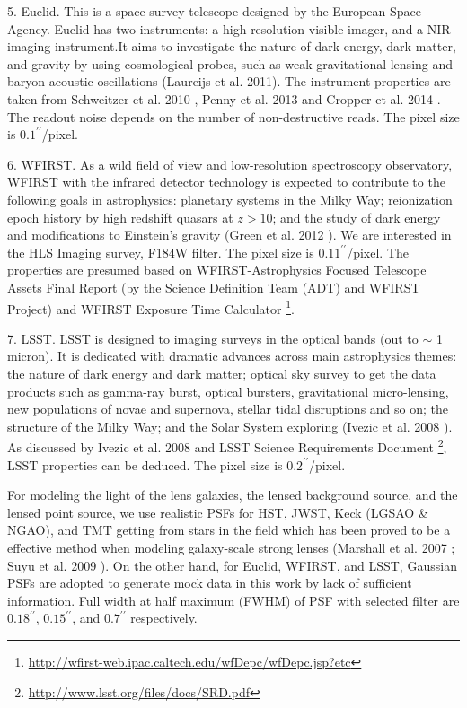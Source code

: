 \documentclass[a4paper,11pt]{article}
\begin{document}
    5. Euclid. This is a space survey telescope designed by the European Space Agency. Euclid has two instruments: a high-resolution visible imager, and a NIR imaging instrument.It aims to investigate the nature of dark energy, dark matter, and gravity by using cosmological probes, such as weak gravitational lensing and baryon acoustic oscillations (Laureijs et al. 2011). The instrument properties are taken from Schweitzer et al. 2010 \cite{2010SPIE.7731E..1KS}, Penny et al. 2013 \cite{2013MNRAS.434....2P} and Cropper et al. 2014 \cite{2014SPIE.9143E..0JC}. The readout noise depends on the number of non-destructive reads. The pixel size is $0.1^{\prime\prime}$/pixel.
    
    6. WFIRST. As a wild field of view and low-resolution spectroscopy observatory, WFIRST with the infrared detector technology is expected to contribute to the following goals in astrophysics: planetary systems in the Milky Way; reionization epoch history by high redshift quasars at $z>10$; and the study of dark energy and modifications to Einstein's gravity (Green et al. 2012 \cite{2012arXiv1208.4012G}). We are interested in the HLS Imaging survey, F184W filter. The pixel size is $0.11^{\prime\prime}$/pixel. The properties are presumed based on WFIRST-Astrophysics Focused Telescope Assets Final Report (by the Science Definition Team (ADT) and WFIRST Project) and WFIRST Exposure Time Calculator \footnote{\url{http://wfirst-web.ipac.caltech.edu/wfDepc/wfDepc.jsp?etc}}.
    
    7. LSST. LSST is designed to imaging surveys in the optical bands (out to $\sim$ 1 micron). It is dedicated with dramatic advances across main astrophysics themes: the nature of dark energy and dark matter; optical sky survey to get the data products such as gamma-ray burst, optical bursters, gravitational micro-lensing, new populations of novae and supernova, stellar tidal disruptions and so on; the structure of the Milky Way; and the Solar System exploring (Ivezic et al. 2008 \cite{2008arXiv0805.2366I}). As discussed by Ivezic et al. 2008 and LSST Science Requirements Document \footnote{\url{http://www.lsst.org/files/docs/SRD.pdf}}, LSST properties can be deduced. The pixel size is $0.2^{\prime\prime}$/pixel.

For modeling the light of the lens galaxies, the lensed background source, and the lensed point source, we use realistic PSFs for HST, JWST, Keck (LGSAO \& NGAO), and TMT getting from stars in the field which has been proved to be a effective method when modeling galaxy-scale strong lenses (Marshall et al. 2007 \cite{2007ApJ...671.1196M}; Suyu et al. 2009 \cite{2009ApJ...691..277S}). On the other hand, for Euclid, WFIRST, and LSST, Gaussian PSFs are adopted to generate mock data in this work by lack of sufficient information. Full width at half maximum (FWHM) of PSF with selected filter are $0.18^{\prime\prime}$, $0.15^{\prime\prime}$, and $0.7^{\prime\prime}$ respectively.
\end{document}
